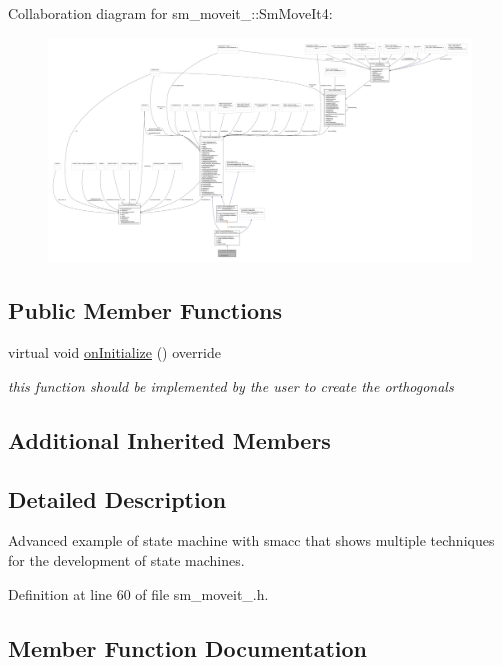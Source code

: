 Collaboration diagram for sm\+\_\+moveit\+\_\+:\+:Sm\+Move\+It4\+:
\nopagebreak
\begin{figure}[H]
\begin{center}
\leavevmode
\includegraphics[width=350pt]{structsm__moveit__4_1_1SmMoveIt4__coll__graph}
\end{center}
\end{figure}
\subsection*{Public Member Functions}
\begin{DoxyCompactItemize}
\item 
virtual void \hyperlink{structsm__moveit__4_1_1SmMoveIt4_a6a8149ada7bb62f89ccc514ad7408f15}{on\+Initialize} () override
\begin{DoxyCompactList}\small\item\em this function should be implemented by the user to create the orthogonals \end{DoxyCompactList}\end{DoxyCompactItemize}
\subsection*{Additional Inherited Members}


\subsection{Detailed Description}
Advanced example of state machine with smacc that shows multiple techniques for the development of state machines. 

Definition at line 60 of file sm\+\_\+moveit\+\_.\+h.



\subsection{Member Function Documentation}
\mbox{\label{structsm__moveit__4_1_1SmMoveIt4_a6a8149ada7bb62f89ccc514ad7408f15}} 
